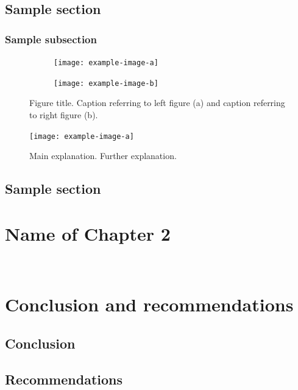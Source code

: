 \documentclass[11pt]{report}
\numberwithin{equation}{chapter}		%
\numberwithin{figure}{chapter}			%
\numberwithin{table}{chapter}			%
\begin{document}
	\section{Sample section}
	\lipsum[3-6]
	\subsection{Sample subsection}
	\lipsum[3-6]

	\begin{figure}[ht]
		\centering
		\begin{subfigure}{0.48\linewidth}
			\centering
			\texttt{[image: example-image-a]}
			\caption{}
			\label{fig:label1}
		\end{subfigure}
		\begin{subfigure}{0.48\linewidth}
			\centering
			\texttt{[image: example-image-b]}
			\caption{}
			\label{fig:label2}
		\end{subfigure}
		\caption{Figure title. Caption referring to left figure (a) and caption referring to right figure (b).}
		\label{fig:label3}
	\end{figure}

	\begin{figure}[ht]
	    \centering
	    \texttt{[image: example-image-a]}
	    \caption{Main explanation. Further explanation.}
	    \label{fig:label4}
	\end{figure}

	\section{Sample section}
	\lipsum[3-6]

	\newpage
	\chapter{Name of Chapter 2}
	\lipsum[3-6]

	\newpage
	\thispagestyle{empty} \ \newpage

	\chapter{Conclusion and recommendations}
	\section{Conclusion}
	\lipsum[3]

	\section{Recommendations}
	\lipsum[3]
\end{document}
